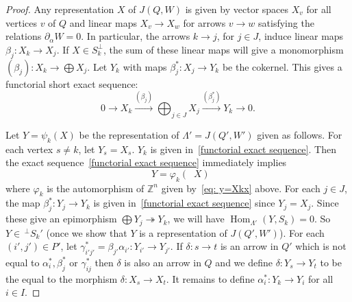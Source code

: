 \documentclass[ALCO,ThmDefs,Unicode,epreuves]{cedram}
\newcommand{\onto}{\twoheadrightarrow}
\DeclareMathOperator{\Hom}{Hom}%
\DeclareMathOperator{\undim}{\underline{dim}}
\newcommand{\field}[1]{\mathbb{#1}}
\newcommand{\ZZ}{\ensuremath{{\field{Z}}}}
\begin{document}
\begin{proof}%



Any representation $X$ of $J(Q,W)$ is given by vector spaces $X_v$ for all vertices $v$ of $Q$ and linear maps $X_v\to X_w$ for arrows $v\to w$ satisfying the relations $\partial_\alpha W=0$. In particular, the arrows $k\to j$, for $j\in J$, induce linear maps $\beta_j:X_k\to X_j$. If $X\in S_k^\perp$, the sum of these linear maps will give a monomorphism $(\beta_j):X_k\to \bigoplus X_j$. Let $Y_k$ with maps $\beta_j^\ast:X_j\to Y_k$ be the cokernel. This gives a functorial short exact sequence:
\begin{equation}\label{functorial exact sequence}
	0\to X_k\xrightarrow{(\beta_j)}\bigoplus_{j\in J} X_j\xrightarrow{(\beta_j^\ast)}Y_k\to 0.
\end{equation}

Let $Y=\psi_k(X)$ be the representation of $\Lambda'=J(Q',W')$ given as follows. For each vertex $s\neq k$, let $Y_s=X_s$. $Y_k$ is given in~\eqref{functorial exact sequence}. Then the exact sequence~\eqref{functorial exact sequence} immediately implies
\[
	\undim Y=\varphi_k(\undim X)
\]
where $\varphi_k$ is the automorphism of $\ZZ^n$ given by~\eqref{eq: y=Xkx} above. For each $j\in J$, the map $\beta_j^\ast:Y_j\to Y_k$ is given in~\eqref{functorial exact sequence} since $Y_j=X_j$. Since these give an epimorphism $\bigoplus Y_j\onto Y_k$, we will have $\Hom_{\Lambda'}(Y,S_k)=0$. So $Y\in\,^{\perp}S_k'$ (once we show that $Y$ is a representation of $J(Q',W')$). For each $(i',j')\in P'$, let $\gamma_{i'j'}^\ast= \beta_{j'}\alpha_{i'}: Y_{i'}\to Y_{j'}$. If $\delta:s\to t$ is an arrow in $Q'$ which is not equal to $\alpha_i^\ast,\beta_j^\ast$ or $\gamma_{ij}^\ast$ then $\delta$ is also an arrow in $Q$ and we define $\delta:Y_s\to Y_t$ to be the equal to the morphism $\delta:X_s\to X_t$. It remains to define $\alpha_i^\ast:Y_k\to Y_i$ for all $i\in I$.



\end{proof}
\end{document}
